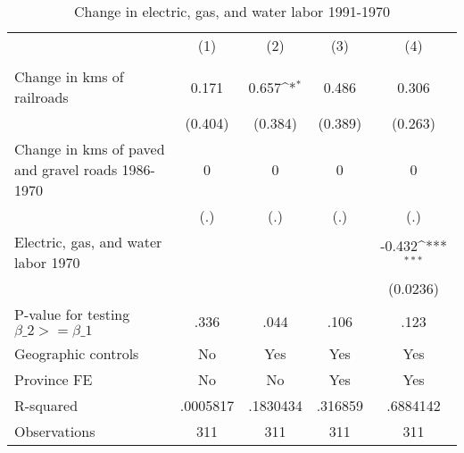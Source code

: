 \begin{table}[htbp]\centering
\def\sym#1{\ifmmode^{#1}\else\(^{#1}\)\fi}
\caption{Change in electric, gas, and water labor 1991-1970}
\begin{tabular}{l*{4}{c}}
\hline\hline
                &\multicolumn{1}{c}{(1)}&\multicolumn{1}{c}{(2)}&\multicolumn{1}{c}{(3)}&\multicolumn{1}{c}{(4)}\\
                &\multicolumn{1}{c}{}&\multicolumn{1}{c}{}&\multicolumn{1}{c}{}&\multicolumn{1}{c}{}\\
\hline
Change in kms of railroads&    0.171         &    0.657\sym{*}  &    0.486         &    0.306         \\
                &  (0.404)         &  (0.384)         &  (0.389)         &  (0.263)         \\
[1em]
Change in kms of paved and gravel roads 1986-1970&        0         &        0         &        0         &        0         \\
                &      (.)         &      (.)         &      (.)         &      (.)         \\
[1em]
Electric, gas, and water labor 1970&                  &                  &                  &   -0.432\sym{***}\\
                &                  &                  &                  & (0.0236)         \\
\hline
P-value for testing $\beta\_{2} >= \beta\_{1}$&     .336         &     .044         &     .106         &     .123         \\
Geographic controls&       No         &      Yes         &      Yes         &      Yes         \\
Province FE     &       No         &       No         &      Yes         &      Yes         \\
R-squared       & .0005817         & .1830434         &  .316859         & .6884142         \\
Observations    &      311         &      311         &      311         &      311         \\
\hline\hline
\end{tabular}
\end{table}
